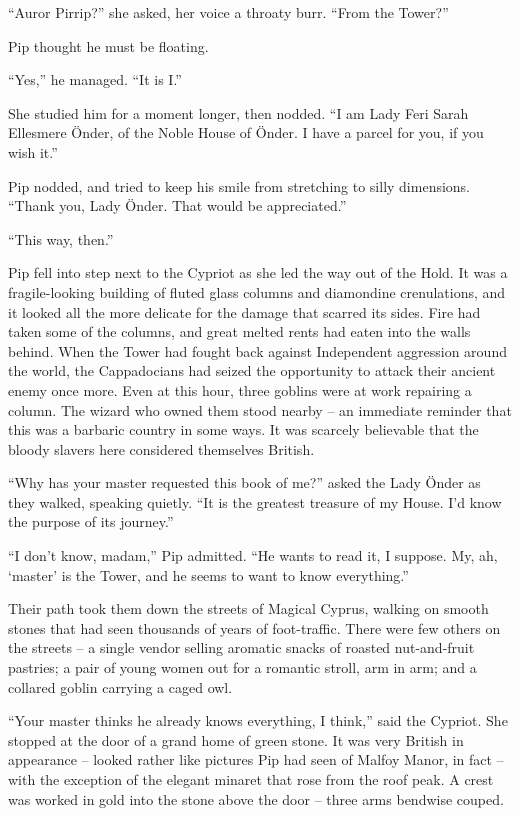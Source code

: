 ``Auror Pirrip?'' she asked, her voice a throaty burr. ``From the
Tower?''

Pip thought he must be floating.

``Yes,'' he managed. ``It is I.''

She studied him for a moment longer, then nodded. ``I am Lady Feri Sarah
Ellesmere Önder, of the Noble House of Önder. I have a parcel for you,
if you wish it.''

Pip nodded, and tried to keep his smile from stretching to silly
dimensions. ``Thank you, Lady Önder. That would be appreciated.''

``This way, then.''

Pip fell into step next to the Cypriot as she led the way out of the
Hold. It was a fragile-looking building of fluted glass columns and
diamondine crenulations, and it looked all the more delicate for the
damage that scarred its sides. Fire had taken some of the columns, and
great melted rents had eaten into the walls behind. When the Tower had
fought back against Independent aggression around the world, the
Cappadocians had seized the opportunity to attack their ancient enemy
once more. Even at this hour, three goblins were at work repairing a
column. The wizard who owned them stood nearby -- an immediate reminder
that this was a barbaric country in some ways. It was scarcely
believable that the bloody slavers here considered themselves British.

``Why has your master requested this book of me?'' asked the Lady Önder
as they walked, speaking quietly. ``It is the greatest treasure of my
House. I'd know the purpose of its journey.''

``I don't know, madam,'' Pip admitted. ``He wants to read it, I suppose.
My, ah, `master' is the Tower, and he seems to want to know
everything.''

Their path took them down the streets of Magical Cyprus, walking on
smooth stones that had seen thousands of years of foot-traffic. There
were few others on the streets -- a single vendor selling aromatic
snacks of roasted nut-and-fruit pastries; a pair of young women out for
a romantic stroll, arm in arm; and a collared goblin carrying a caged
owl.

``Your master thinks he already knows everything, I think,'' said the
Cypriot. She stopped at the door of a grand home of green stone. It was
very British in appearance -- looked rather like pictures Pip had seen
of Malfoy Manor, in fact -- with the exception of the elegant minaret
that rose from the roof peak. A crest was worked in gold into the stone
above the door -- three arms bendwise couped.

